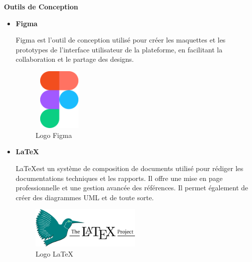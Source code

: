 \textbf{Outils de Conception}
\begin{itemize}
  \item \textbf{Figma}

    Figma est l'outil de conception utilisé pour créer les maquettes et les
    prototypes de l'interface utilisateur de la plateforme, en facilitant la
    collaboration et le partage des designs.

    \begin{figure}[H]
      \centering
      \includegraphics[width=1.0in, height=1.2in]{images/800px-Figma-logo.svg.png}
      \caption{Logo Figma}
    \end{figure}

  \item \textbf{\LaTeX}

    \LaTeX est un système de composition de documents utilisé pour rédiger les
    documentations techniques et les rapports. Il offre une mise en
    page professionnelle et une gestion avancée des références. Il permet
    également de créer des diagrammes UML et de toute sorte.

    \begin{figure}[H]
      \centering
      \includegraphics[width=0.5\textwidth]{images/LaTeX_project_logo_bird.svg.png}
      \caption{Logo \LaTeX}
    \end{figure}
\end{itemize}

